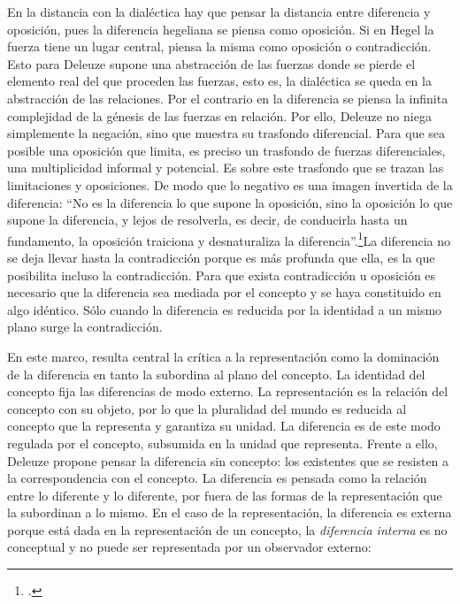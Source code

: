 En la distancia con la dialéctica hay que pensar la distancia entre diferencia y oposición, pues la diferencia hegeliana se piensa como oposición. Si en Hegel la fuerza tiene un lugar central, piensa la misma como oposición o contradicción. Esto para Deleuze supone una abstracción de las fuerzas donde se pierde el elemento real del que proceden las fuerzas, esto es, la dialéctica se queda en la abstracción de las relaciones. Por el contrario en la diferencia se piensa la infinita complejidad de la génesis de las fuerzas en relación. Por ello, Deleuze no niega simplemente la negación, sino que muestra su trasfondo diferencial. Para que sea posible una oposición que limita, es preciso un trasfondo de fuerzas diferenciales, una multiplicidad informal y potencial. Es sobre este trasfondo que se trazan las limitaciones y oposiciones. De modo que lo negativo es una imagen invertida de la diferencia: \enquote{No es la diferencia lo que supone la oposición, sino la oposición lo que supone la diferencia, y lejos de resolverla, es decir, de conducirla hasta un fundamento, la oposición traiciona y desnaturaliza la diferencia}.\footcite[94]{@6961-DELEUZE2002}La diferencia no se deja llevar hasta la contradicción porque es más profunda que ella, es la que posibilita incluso la contradicción. Para que exista contradicción u oposición es necesario que la diferencia sea mediada por el concepto y se haya constituido en algo idéntico. Sólo cuando la diferencia es reducida por la identidad a un mismo plano surge la contradicción.

En este marco, resulta central la crítica a la representación como la dominación de la diferencia en tanto la subordina al plano del concepto. La identidad del concepto fija las diferencias de modo externo. La representación es la relación del concepto con su objeto, por lo que la pluralidad del mundo es reducida al concepto que la representa y garantiza su unidad. La diferencia es de este modo regulada por el concepto, subsumida en la unidad que representa. Frente a ello, Deleuze propone pensar la diferencia sin concepto: los existentes que se resisten a la correspondencia con el concepto. La diferencia es pensada como la relación entre lo diferente y lo diferente, por fuera de las formas de la representación que la subordinan a lo mismo. En el caso de la representación, la diferencia es externa porque está dada en la representación de un concepto, la \emph{diferencia interna} es no conceptual y no puede ser representada por un observador externo:

